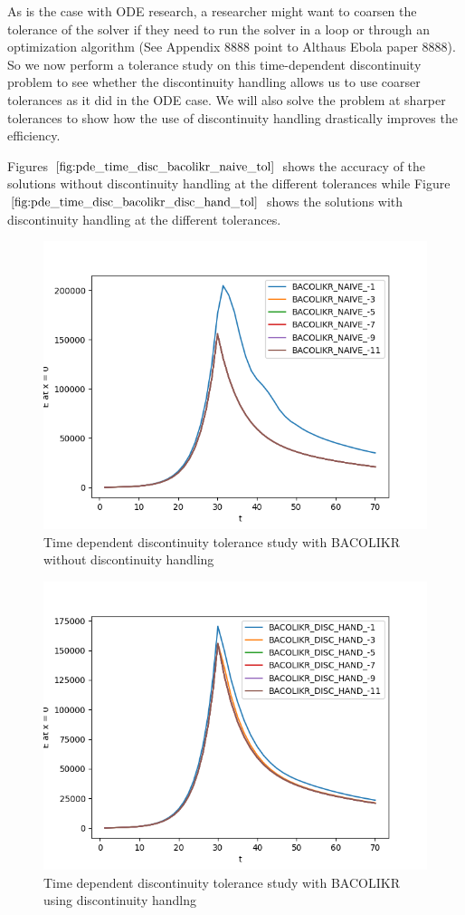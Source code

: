 \documentclass{article}
\begin{document}
As is the case with ODE research, a researcher might want to coarsen the tolerance of the solver if they need to run the solver in a loop or through an optimization algorithm (See Appendix 8888 point to Althaus Ebola paper 8888). So we now perform a tolerance study on this time-dependent discontinuity problem to see whether the discontinuity handling allows us to use coarser tolerances as it did in the ODE case. We will also solve the problem at sharper tolerances to show how the use of discontinuity handling drastically improves the efficiency.

Figures $\ref{fig:pde_time_disc_bacolikr_naive_tol}$ shows the accuracy of the solutions without discontinuity handling at the different tolerances while Figure $\ref{fig:pde_time_disc_bacolikr_disc_hand_tol}$ shows the solutions with discontinuity handling at the different tolerances.
\begin{figure}[H]
\centering
\includegraphics[width=0.7\linewidth]{./figures/pde_time_disc_bacolikr_naive_tol}
\caption{Time dependent discontinuity tolerance study with BACOLIKR without discontinuity handling}
\label{fig:pde_time_disc_bacolikr_naive_tol}
\end{figure}

\begin{figure}[H]
\centering
\includegraphics[width=0.7\linewidth]{./figures/pde_time_disc_bacolikr_disc_hand_tol}
\caption{Time dependent discontinuity tolerance study with BACOLIKR using discontinuity handlng}
\label{fig:pde_time_disc_bacolikr_disc_hand_tol}
\end{figure}
\end{document}
